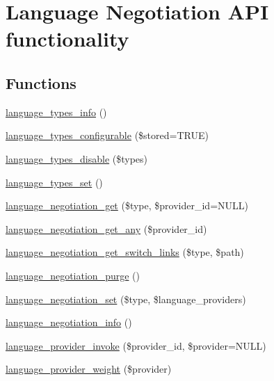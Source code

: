 \hypertarget{group__language__negotiation}{
\section{Language Negotiation API functionality}
\label{group__language__negotiation}
}
\subsection*{Functions}
\begin{DoxyCompactItemize}
\item 
\hyperlink{group__language__negotiation_gadf6422ee7cb14204e01311f85a8c8b18}{language\_\-types\_\-info} ()
\item 
\hyperlink{group__language__negotiation_gaa05284e85de23a8a8ab54adbd8548cb4}{language\_\-types\_\-configurable} (\$stored=TRUE)
\item 
\hyperlink{group__language__negotiation_ga04fd94cbb41f6b24ef9d3b4c37df86c1}{language\_\-types\_\-disable} (\$types)
\item 
\hyperlink{group__language__negotiation_ga6f6a0814332d6232293b84b38de5d4d0}{language\_\-types\_\-set} ()
\item 
\hyperlink{group__language__negotiation_ga041066fd7d9ca70def383225d104c431}{language\_\-negotiation\_\-get} (\$type, \$provider\_\-id=NULL)
\item 
\hyperlink{group__language__negotiation_gadee487a44c0202fa55b74ea1541055d0}{language\_\-negotiation\_\-get\_\-any} (\$provider\_\-id)
\item 
\hyperlink{group__language__negotiation_gab97e8b88791a7487449a1a1e4eec871c}{language\_\-negotiation\_\-get\_\-switch\_\-links} (\$type, \$path)
\item 
\hyperlink{group__language__negotiation_ga3a0f894378f49038dbbaf35909a8e215}{language\_\-negotiation\_\-purge} ()
\item 
\hyperlink{group__language__negotiation_ga3a4f8df0ad1b5fef7399929111bab35a}{language\_\-negotiation\_\-set} (\$type, \$language\_\-providers)
\item 
\hyperlink{group__language__negotiation_ga5e41e506c539a01a4ee945857c526e78}{language\_\-negotiation\_\-info} ()
\item 
\hyperlink{group__language__negotiation_ga031f4e0102fa2365a45709ff6935fee2}{language\_\-provider\_\-invoke} (\$provider\_\-id, \$provider=NULL)
\item 
\hyperlink{group__language__negotiation_ga6ab68f6fac82e1ae755c06787b042a39}{language\_\-provider\_\-weight} (\$provider)

\end{DoxyCompactItemize}
